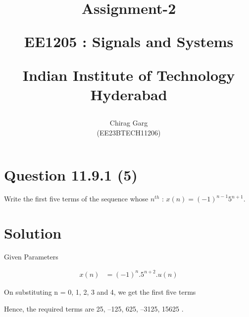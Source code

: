 \documentclass[journal,12pt,twocolumn]{IEEEtran}
\theoremstyle{remark}
\begin{document}
%




\vspace{3cm}

\title{
Assignment-2

\large{EE1205 : Signals and Systems}

Indian Institute of Technology Hyderabad
}
\author{Chirag Garg

(EE23BTECH11206)
}	





\maketitle

\newpage



\bigskip

\renewcommand{\thefigure}{\arabic{figure}}
\renewcommand{\thetable}{\arabic{table}}


\section{Question 11.9.1 (5)}
\vspace{0.5cm}
\begin{flushleft}
 Write the first five terms of the sequence whose $n^{th}$  : $x(n) = (-1)^{n-1}5^{n+1}$.
\end{flushleft} 


\vspace{0.8cm}


\section{Solution} 



\begin{table}[htbp]
\centering
\resizebox{\columnwidth}{!}{
}
\caption{ Given Parameters}

\end{table}

\begin{align}
	     x(n) &= (-1)^{n}.5^{n+2}.u(n)
 \end{align}
 
On substituting n = 0, 1, 2, 3 and 4, we get the first five terms 

Hence, the required terms are 25, –125, 625, –3125, 15625 .
\end{document}
